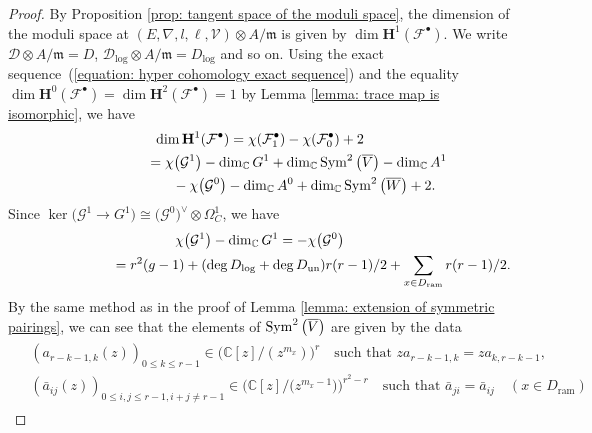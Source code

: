 \documentclass[pdftex]{sigma}
\numberwithin{equation}{section}
\newcommand{\Sym}{\mathop{\rm Sym}\nolimits}
\begin{document}
\begin{proof}
By Proposition \ref{prop: tangent space of the moduli space},
the dimension of the moduli space at
$(E,\nabla,l,\ell,{\mathcal V})\otimes A/\mathfrak{m}$
is given by
$\dim \mathbf{H}^1({\mathcal F}^{\bullet})$.
We write ${\mathcal D}\otimes A/\mathfrak{m}=D$,
${\mathcal D}_{\mathrm{log}}\otimes A/\mathfrak{m}=D_{\mathrm{log}}$ and so on.
Using the exact sequence~(\ref{equation: hyper cohomology exact sequence})
and the equality
$\dim\mathbf{H}^0({\mathcal F}^{\bullet})=
\dim\mathbf{H}^2({\mathcal F}^{\bullet})=1$
by Lemma \ref{lemma: trace map is isomorphic}, we have
\begin{gather}
 \dim \mathbf{H}^1({\mathcal F}^{\bullet}) =
 \chi({\mathcal F}_1^{\bullet})-\chi({\mathcal F}_0^{\bullet})+2\nonumber \\
 \hphantom{\dim \mathbf{H}^1({\mathcal F}^{\bullet})}{}
 =\chi\big({\mathcal G}^1\big)-\dim_{\mathbb{C}} G^1
 +\dim_{\mathbb{C}} \Sym^2\big(\overline{V}\big) -\dim_{\mathbb{C}} A^1\nonumber \\
\hphantom{\dim \mathbf{H}^1({\mathcal F}^{\bullet})=}{}
 -\chi\big({\mathcal G}^0\big)-\dim_{\mathbb{C}} A^0
 +\dim_{\mathbb{C}} \Sym^2\big(\overline{W}\big) +2.\label{equation: formula of H^1-cohomology}
\end{gather}
Since
$\ker\big({\mathcal G}^1\rightarrow G^1\big)\cong \big({\mathcal G}^0\big)^{\vee}\otimes\Omega^1_C$,
we have
\begin{gather}
 \chi\big({\mathcal G}^1\big)-\dim_{\mathbb{C}}G^1 =
 -\chi\big({\mathcal G}^0\big)\nonumber \\
\hphantom{\chi\big({\mathcal G}^1\big)-\dim_{\mathbb{C}}G^1}{}=
 r^2(g-1)+(\deg D_{\mathrm{log}}+\deg D_{\mathrm{un}})r(r-1)/2
 +\sum_{x\in D_{\mathrm{ram}}}r(r-1)/2.\label{equation: chi of G^0, G^1}
\end{gather}
By the same method as in the proof of Lemma \ref{lemma: extension of symmetric pairings},
we can see that the elements of $\Sym^2\big(\overline{V}\big)$ are given by the data
\begin{gather*}
\begin{split}
& (a_{r-k-1,k}(z))_{0\leq k\leq r-1}
 \in \big(\mathbb{C}[z]/(z^{m_x})\big)^r \quad
 \text{such that $za_{r-k-1,k}=za_{k,r-k-1}$},
 \\
 & (\bar{a}_{ij}(z))_{0\leq i,j\leq r-1, i+j\neq r-1}
 \in \big(\mathbb{C}[z]/\big(z^{m_x-1}\big) \big)^{r^2-r}
 \quad \text{such that $\bar{a}_{ji}=\bar{a}_{ij}$} \quad (x\in D_{\mathrm{ram}})
\end{split}
\end{gather*}

\end{proof}
\end{document}
